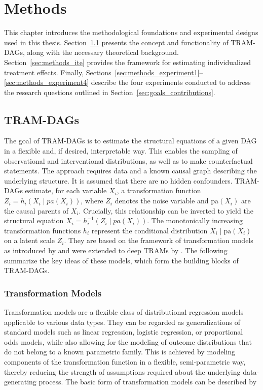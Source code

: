 




\chapter{Methods}

This chapter introduces the methodological foundations and experimental designs used in this thesis. Section~\ref{sec:methods_tram_dags} presents the concept and functionality of TRAM-DAGs, along with the necessary theoretical background. Section~\ref{sec:methods_ite} provides the framework for estimating individualized treatment effects. Finally, Sections~\ref{sec:methods_experiment1}--\ref{sec:methods_experiment4} describe the four experiments conducted to address the research questions outlined in Section~\ref{sec:goals_contributions}.


\section{TRAM-DAGs} \label{sec:methods_tram_dags}

The goal of TRAM-DAGs is to estimate the structural equations of a given DAG in a flexible and, if desired, interpretable way. This enables the sampling of observational and interventional distributions, as well as to make counterfactual statements. The approach requires data and a known causal graph describing the underlying structure. It is assumed that there are no hidden confounders. TRAM-DAGs estimate, for each variable $X_i$, a transformation function $Z_i = h_i(X_i \mid pa(X_i))$, where $Z_i$ denotes the noise variable and $\text{pa}(X_i)$ are the causal parents of $X_i$. Crucially, this relationship can be inverted to yield the structural equation $X_i = h_i^{-1}(Z_i \mid pa(X_i))$. The monotonically increasing transformation functions $h_i$ represent the conditional distribution  $X_i \mid \text{pa}(X_i)$ on a latent scale $Z_i$. They are based on the framework of transformation models as introduced by \citet{hothorn2014} and were extended to deep TRAMs by \citet{sick2020}. The following summarize the key ideas of these models, which form the building blocks of TRAM-DAGs.


\subsection{Transformation Models}


Transformation models are a flexible class of distributional regression models applicable to various data types. They can be regarded as generalizations of standard models such as linear regression, logistic regression, or proportional odds models, while also allowing for the modeling of outcome distributions that do not belong to a known parametric family. This is achieved by modeling components of the transformation function in a flexible, semi-parametric way, thereby reducing the strength of assumptions required about the underlying data-generating process. The basic form of transformation models can be described by 

